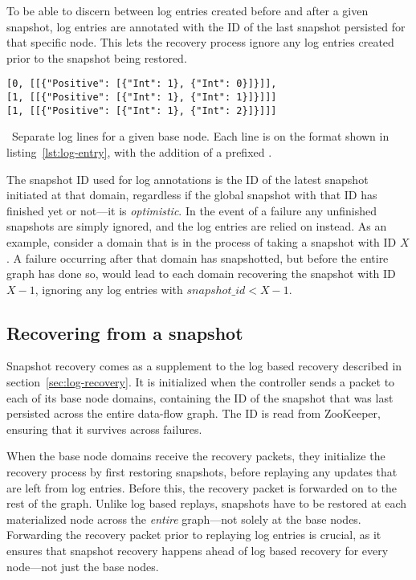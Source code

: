 To be able to discern between log entries created before and after a given
snapshot, log entries are annotated with the ID of the last snapshot persisted
for that specific node. This lets the recovery process ignore any log entries
created prior to the snapshot being restored.

\begin{listing}[H]
  \begin{verbatim}
[0, [[{"Positive": [{"Int": 1}, {"Int": 0}]}]],
[1, [[{"Positive": [{"Int": 1}, {"Int": 1}]}]]]
[1, [[{"Positive": [{"Int": 1}, {"Int": 2}]}]]]
  \end{verbatim}
  \caption{\
    Separate log lines for a given base node. Each line is on the format shown
    in listing~\ref{lst:log-entry}, with the addition of a prefixed
    \code{snapshot\_id}.
  }
\end{listing}

The snapshot ID used for log annotations is the ID of the latest snapshot
initiated at that domain, regardless if the global snapshot with that ID has
finished yet or not---it is \textit{optimistic}. In the event of a failure any
unfinished snapshots are simply ignored, and the log entries are relied on
instead. As an example, consider a domain that is in the process of taking a
snapshot with ID $ X $. A failure occurring after that domain has snapshotted,
but before the entire graph has done so, would lead to each domain recovering
the snapshot with ID $ X - 1 $, ignoring any log entries with $ snapshot\_id < X
- 1 $.

\subsection{Recovering from a snapshot}

Snapshot recovery comes as a supplement to the log based recovery described in
section~\ref{sec:log-recovery}. It is initialized when the controller sends a
\code{StartRecovery} packet to each of its base node domains, containing the ID
of the snapshot that was last persisted across the entire data-flow graph. The
ID is read from ZooKeeper, ensuring that it survives across failures.

When the base node domains receive the recovery packets, they initialize the
recovery process by first restoring snapshots, before replaying any updates that
are left from log entries. Before this, the recovery packet is forwarded on to
the rest of the graph. Unlike log based replays, snapshots have to be restored
at each materialized node across the \textit{entire} graph---not solely at the
base nodes. Forwarding the recovery packet prior to replaying log entries is
crucial, as it ensures that snapshot recovery happens ahead of log based
recovery for every node---not just the base nodes.

